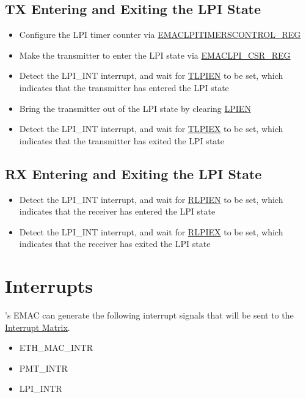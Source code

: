 \documentclass[main\_\_EN.tex]{subfiles}
\begin{document}
\subsection{TX Entering and Exiting the LPI State}
\begin{itemize}
\item Configure the LPI timer counter via \hyperref[regdesc:EMACLPITIMERSCONTROLREG]{EMACLPITIMERSCONTROL\_REG}
\item Make the transmitter to enter the LPI state via \hyperref[regdesc:EMACLPICSRREG]{EMACLPI\_CSR\_REG}
\item Detect the LPI\_INT interrupt, and wait for \hyperref[regdesc:EMACLPICSRREG]{TLPIEN} to be set, which indicates that the transmitter has entered the LPI state
\item Bring the transmitter out of the LPI state by clearing \hyperref[regdesc:EMACLPICSRREG]{LPIEN}
\item Detect the LPI\_INT interrupt, and wait for  \hyperref[regdesc:EMACLPICSRREG]{TLPIEX} to be set, which indicates that the transmitter has exited the LPI state
\end{itemize}

\subsection{RX Entering and Exiting the LPI State}
\begin{itemize}
\item Detect the LPI\_INT interrupt, and wait for \hyperref[regdesc:EMACLPICSRREG]{RLPIEN} to be set, which indicates that the receiver has entered the LPI state
\item Detect the LPI\_INT interrupt, and wait for \hyperref[regdesc:EMACLPICSRREG]{RLPIEX} to be set, which indicates that the receiver has exited the LPI state
\end{itemize}


\section{Interrupts}

\chipname{}'s EMAC can generate the following interrupt signals that will be sent to the \hyperref[mod:intmtrx]{Interrupt Matrix}.

    \begin{itemize}
        \item ETH\_MAC\_INTR
        \item PMT\_INTR
        \item LPI\_INTR
    \end{itemize}
\end{document}
